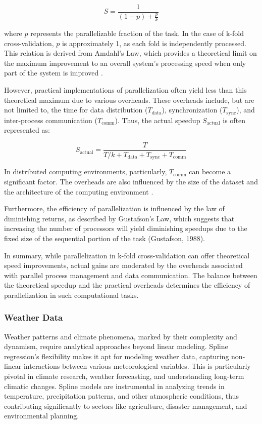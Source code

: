 \documentclass[12pt, twoside,hidelinks]{article}
\theoremstyle{definition}
\numberwithin{equation}{section}
\begin{document}
\[ S = \frac{1}{\left(1 - p\right) + \frac{p}{k}} \]

where \( p \) represents the parallelizable fraction of the task. In the case of k-fold cross-validation, \( p \) is approximately 1, as each fold is independently processed. This relation is derived from Amdahl's Law, which provides a theoretical limit on the maximum improvement to an overall system's processing speed when only part of the system is improved \cite{amdahl1967validity}.

However, practical implementations of parallelization often yield less than this theoretical maximum due to various overheads. These overheads include, but are not limited to, the time for data distribution (\( T_{\text{data}} \)), synchronization (\( T_{\text{sync}} \)), and inter-process communication (\( T_{\text{comm}} \)). Thus, the actual speedup \( S_{\text{actual}} \) is often represented as:

\[ S_{\text{actual}} = \frac{T}{T/k + T_{\text{data}} + T_{\text{sync}} + T_{\text{comm}}} \]

In distributed computing environments, particularly, \( T_{\text{comm}} \) can become a significant factor. The overheads are also influenced by the size of the dataset and the architecture of the computing environment \cite{gustafson1988reevaluating}.

Furthermore, the efficiency of parallelization is influenced by the law of diminishing returns, as described by Gustafson's Law, which suggests that increasing the number of processors will yield diminishing speedups due to the fixed size of the sequential portion of the task (Gustafson, 1988).

In summary, while parallelization in k-fold cross-validation can offer theoretical speed improvements, actual gains are moderated by the overheads associated with parallel process management and data communication. The balance between the theoretical speedup and the practical overheads determines the efficiency of parallelization in such computational tasks.

\subsubsection{Weather Data}

Weather patterns and climate phenomena, marked by their complexity and dynamism, require analytical approaches beyond linear modeling. Spline regression's flexibility makes it apt for modeling weather data, capturing non-linear interactions between various meteorological variables. This is particularly pivotal in climate research, weather forecasting, and understanding long-term climatic changes. Spline models are instrumental in analyzing trends in temperature, precipitation patterns, and other atmospheric conditions, thus contributing significantly to sectors like agriculture, disaster management, and environmental planning.
\end{document}
